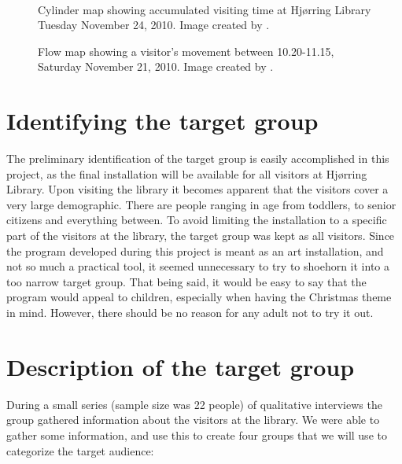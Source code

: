 \begin{figure}[htbp]
\begin{minipage}[b]{0.45\textwidth}
\end{minipage} \\ %
\begin{minipage}[t]{0.45\textwidth}
\caption{Cylinder map showing accumulated visiting time at Hj{\o}rring Library Tuesday November 24, 2010. Image created by \citep{hjoerring_study}.} %
\label{fig:library_cylindermap}
\end{minipage} \hfill
\begin{minipage}[t]{0.45\textwidth}
\caption{Flow map showing a visitor's movement between 10.20-11.15, Saturday November 21, 2010. Image created by \citep{hjoerring_study}.} %
\label{fig:library_flowmap}
\end{minipage}
\end{figure}

\section{Identifying the target group}
The preliminary identification of the target group is easily accomplished in this project, as the final installation will be available for all visitors at Hj{\o}rring Library. Upon visiting the library it becomes apparent that the visitors cover a very large demographic. There are people ranging in age from toddlers, to senior citizens and everything between. To avoid limiting the installation to a specific part of the visitors at the library, the target group was kept as all visitors. Since the program developed during this project is meant as an art installation, and not so much a practical tool, it seemed unnecessary to try to shoehorn it into a too narrow target group. That being said, it would be easy to say that the program would appeal to children, especially when having the Christmas theme in mind. However, there should be no reason for any adult not to try it out.

\section{Description of the target group}
During a small series (sample size was 22 people) of qualitative interviews the group gathered information about the visitors at the library. We were able to gather some information, and use this to create four groups that we will use to categorize the target audience:

